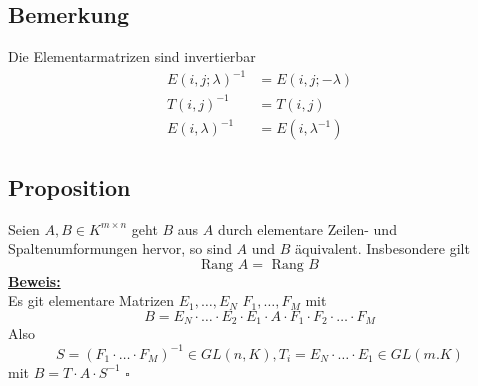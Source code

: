 \subsection{Bemerkung} %
\label{sub:bemerkung}
Die Elementarmatrizen sind invertierbar
\begin{align*}
	E(i,j; \lambda ) ^{-1} &= E (i,j; - \lambda ) \\
	T(i,j) ^{-1} &= T(i,j) \\
	E(i, \lambda ) ^{-1} &= E(i,\lambda ^{-1})
\end{align*}

\subsection{Proposition} %
\label{sub:proposition}
Seien $A,B \in K^{m \times n}$ geht $B$ aus $A$ durch elementare Zeilen- und Spaltenumformungen hervor, so sind $A$ und $B$ äquivalent.
Insbesondere gilt
\[
	\text{Rang }A = \text{ Rang }B
\]
\underline{\textbf{Beweis:}} \\
Es git elementare Matrizen $E_1, \ldots , E_N$ $F_1, \ldots , F_M$ mit 
\[
	B= E_N \cdot \ldots \cdot E_2 \cdot E_1 \cdot A \cdot F_1 \cdot  F_2 \cdot \ldots \cdot F_M
\]
Also
\[
	S= (F_1 \cdot \ldots \cdot F_M) ^{-1} \in GL(n,K), T_i= E_N \cdot \ldots \cdot  E_1 \in GL(m.K)
\]
mit $B=T \cdot A \cdot S ^{-1}$ \hfill \( \square \)

